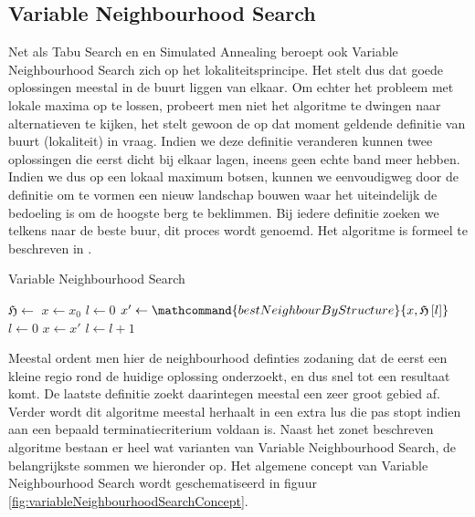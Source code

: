 \subsection{Variable Neighbourhood Search}
\label{ss:variableNeighbourhoodSearch}
Net als Tabu Search en en Simulated Annealing beroept ook Variable Neighbourhood Search zich op het lokaliteitsprincipe. Het stelt dus dat goede oplossingen meestal in de buurt liggen van elkaar. Om echter het probleem met lokale maxima op te lossen, probeert men niet het algoritme te dwingen naar alternatieven te kijken, het stelt gewoon de op dat moment geldende definitie van buurt (lokaliteit) in vraag. Indien we deze definitie veranderen kunnen twee oplossingen die eerst dicht bij elkaar lagen, ineens geen echte band meer hebben. Indien we dus op een lokaal maximum botsen, kunnen we eenvoudigweg door de definitie om te vormen een nieuw landschap bouwen waar het uiteindelijk de bedoeling is om de hoogste berg te beklimmen. Bij iedere definitie zoeken we telkens naar de beste buur, dit proces wordt  genoemd. Het algoritme is formeel te beschreven in .
\begin{algorithm}[htb]
\caption{Variable Neighbourhood Search}
\label{alg:variableNeighbourhoodSearch}
\begin{algorithmic}[1]
\STATE $\mathfrak{H}\leftarrow$
\STATE $x\leftarrow x_0$
\STATE $l\leftarrow 0$
\STATE $x'\leftarrow\mathcommand{bestNeighbourByStructure}{x,\mathfrak{H}\left[l\right]}$
\STATE $l\leftarrow 0$
\STATE $x\leftarrow x'$
\ELSE
\STATE $l\leftarrow l+1$
\ENDIF
\ENDWHILE
\end{algorithmic}
\end{algorithm}
Meestal ordent men hier de neighbourhood definties zodaning dat de eerst een kleine regio rond de huidige oplossing onderzoekt, en dus snel tot een resultaat komt. De laatste definitie zoekt daarintegen meestal een zeer groot gebied af. Verder wordt dit algoritme meestal herhaalt in een extra lus die pas stopt indien aan een bepaald terminatiecriterium voldaan is. Naast het zonet beschreven algoritme bestaan er heel wat varianten van Variable Neighbourhood Search, de belangrijkste sommen we hieronder op. Het algemene concept van Variable Neighbourhood Search wordt geschematiseerd in figuur \ref{fig:variableNeighbourhoodSearchConcept}.
